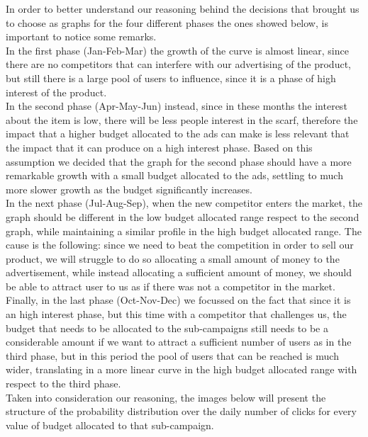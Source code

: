 In order to better understand our reasoning behind the decisions that brought us to choose as graphs for the four different phases the ones showed below, is important to notice some remarks. \\In the first phase (Jan-Feb-Mar) the growth of the curve is almost linear, since there are no competitors that can interfere with our advertising of the product, but still there is a large pool of users to influence, since it is a phase of high interest of the product.\\ In the second phase (Apr-May-Jun) instead, since in these months the interest about the item is low, there will be less people interest in the scarf, therefore the impact that a higher budget allocated to the ads can make is less relevant that the impact that it can produce on a high interest phase. Based on this assumption we decided that the graph for the second phase should have a more remarkable growth with a small budget allocated to the ads, settling to much more slower growth as the budget significantly increases. \\In the next phase (Jul-Aug-Sep), when the new competitor enters the market, the graph should be different in the low budget allocated range respect to the second graph, while maintaining a similar profile in the high budget allocated range. The cause is the following: since we need to beat the competition in order to sell our product, we will struggle to do so allocating a small amount of money to the advertisement, while instead allocating a sufficient amount of money, we should be able to attract user to us as if there was not a competitor in the market. \\Finally, in the last phase (Oct-Nov-Dec) we focussed on the fact that since it is an high interest phase, but this time with a competitor that challenges us, the budget that needs to be allocated to the sub-campaigns still needs to be a considerable amount if we want to attract a sufficient number of users as in the third phase, but in this period the pool of users that can be reached is much wider, translating in a more linear curve in the high budget allocated range with respect to the third phase.\\
Taken into consideration our reasoning, the images below will present the structure of the probability distribution over the daily number of clicks for every value of budget allocated to that sub-campaign.\\
